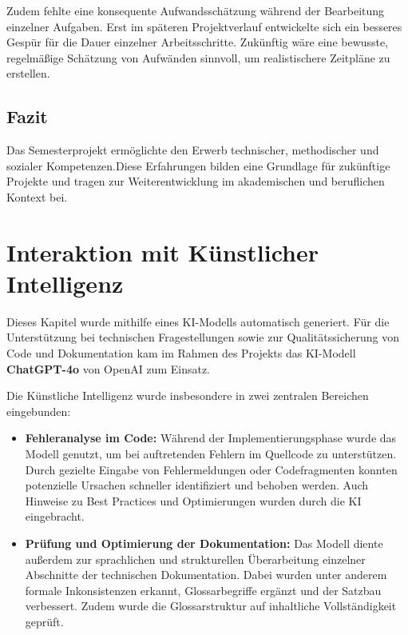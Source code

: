 \documentclass[a4paper,12pt]{article}
\begin{document}
Zudem fehlte eine konsequente Aufwandsschätzung während der Bearbeitung einzelner Aufgaben. Erst im späteren Projektverlauf entwickelte sich ein besseres Gespür für die Dauer einzelner Arbeitsschritte. Zukünftig wäre eine bewusste, regelmäßige Schätzung von Aufwänden sinnvoll, um realistischere Zeitpläne zu erstellen.


\subsection{Fazit}

Das Semesterprojekt ermöglichte den Erwerb technischer, methodischer und sozialer Kompetenzen.Diese Erfahrungen bilden eine Grundlage für zukünftige Projekte und tragen zur Weiterentwicklung im akademischen und beruflichen Kontext bei.

\newpage


\section{Interaktion mit Künstlicher Intelligenz}

Dieses Kapitel wurde mithilfe eines KI-Modells automatisch generiert. Für die Unterstützung bei technischen Fragestellungen sowie zur Qualitätssicherung von Code und Dokumentation kam im Rahmen des Projekts das KI-Modell \textbf{ChatGPT-4o} von OpenAI zum Einsatz.

Die Künstliche Intelligenz wurde insbesondere in zwei zentralen Bereichen eingebunden:

\begin{itemize}
  \item \textbf{Fehleranalyse im Code:} Während der Implementierungsphase wurde das Modell genutzt, um bei auftretenden Fehlern im Quellcode zu unterstützen. Durch gezielte Eingabe von Fehlermeldungen oder Codefragmenten konnten potenzielle Ursachen schneller identifiziert und behoben werden. Auch Hinweise zu Best Practices und Optimierungen wurden durch die KI eingebracht.

  \item \textbf{Prüfung und Optimierung der Dokumentation:} Das Modell diente außerdem zur sprachlichen und strukturellen Überarbeitung einzelner Abschnitte der technischen Dokumentation. Dabei wurden unter anderem formale Inkonsistenzen erkannt, Glossarbegriffe ergänzt und der Satzbau verbessert. Zudem wurde die Glossarstruktur auf inhaltliche Vollständigkeit geprüft.

\end{itemize}
\end{document}
